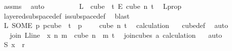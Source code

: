 \begin{isabellebody}
\ assms{\isacharparenleft}{\kern0pt}{}{\isacharparenright}{\kern0pt}\ \isamarkupfalse%
\ auto\ \isanewline
\ \ \ \ \ \isamarkupfalse%
\ \isamarkupfalse%
\ {\isachardoublequoteopen}L\ {\isasymin}\ cube\ {}\ {\isacharparenleft}{\kern0pt}t{\isacharplus}{\kern0pt}{}{\isacharparenright}{\kern0pt}\ {\isasymrightarrow}\isactrlsub E\ cube\ n\ {\isacharparenleft}{\kern0pt}t{\isacharplus}{\kern0pt}{}{\isacharparenright}{\kern0pt}{\isachardoublequoteclose}\ \isamarkupfalse%
\ L{\isacharunderscore}{\kern0pt}prop\ \isamarkupfalse%
\ layered{\isacharunderscore}{\kern0pt}subspace{\isacharunderscore}{\kern0pt}def\ is{\isacharunderscore}{\kern0pt}subspace{\isacharunderscore}{\kern0pt}def\ \isamarkupfalse%
\ blast\isanewline
\ \ \ \ \ \isamarkupfalse%
\ \isamarkupfalse%
\ {\isachardoublequoteopen}L\ {\isacharparenleft}{\kern0pt}SOME\ p{\isachardot}{\kern0pt}\ p{\isasymin}cube\ {}\ {\isacharparenleft}{\kern0pt}t{\isacharplus}{\kern0pt}{}{\isacharparenright}{\kern0pt}\ {\isasymand}\ p\ {}\ {\isacharequal}{\kern0pt}\ {}{\isacharparenright}{\kern0pt}\ {\isasymin}\ cube\ n\ {\isacharparenleft}{\kern0pt}t{\isacharplus}{\kern0pt}{}{\isacharparenright}{\kern0pt}{\isachardoublequoteclose}\ \isamarkupfalse%
\ calculation\ {\isacharparenleft}{\kern0pt}{}{\isacharcomma}{\kern0pt}{}{\isacharparenright}{\kern0pt}\ \isamarkupfalse%
\ cube{\isacharunderscore}{\kern0pt}def\ \isamarkupfalse%
\ auto\isanewline
\ \ \ \ \ \isamarkupfalse%
\ \isamarkupfalse%
\ {\isachardoublequoteopen}join\ {\isacharparenleft}{\kern0pt}L{\isacharunderscore}{\kern0pt}line\ {}{\isacharparenright}{\kern0pt}\ x\ n\ m\ {\isasymin}\ cube\ {\isacharparenleft}{\kern0pt}n\ {\isacharplus}{\kern0pt}\ m{\isacharparenright}{\kern0pt}\ {\isacharparenleft}{\kern0pt}t{\isacharplus}{\kern0pt}{}{\isacharparenright}{\kern0pt}{\isachardoublequoteclose}\ \isamarkupfalse%
\ join{\isacharunderscore}{\kern0pt}cubes\ a\ calculation{\isacharparenleft}{\kern0pt}{}{\isacharcomma}{\kern0pt}\ {}{\isacharparenright}{\kern0pt}\ \isamarkupfalse%
\ auto\isanewline
\ \ \ \ \ \isamarkupfalse%
\ \isamarkupfalse%
\ {\isachardoublequoteopen}{\isasymchi}S\ x\ {\isasymin}\ {\isacharbraceleft}{\kern0pt}{\isachardot}{\kern0pt}{\isachardot}{\kern0pt}{\isacharless}{\kern0pt}r{\isacharbraceright}{\kern0pt}{\isachardoublequoteclose}\ \isamarkupfalse%

\end{isabellebody}
